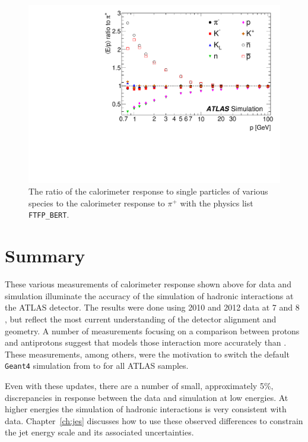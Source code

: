 \begin{figure}[htbp]
\centering
\includegraphics[width=.58\textwidth]{figures/simulated_response.pdf}
\caption{The ratio of the calorimeter response to single particles of various species to the calorimeter response to $\pi^+$ with the physics list \texttt{FTFP\_BERT}.}
\label{fig:simulated_response}
\end{figure}


\section{Summary}

These various measurements of calorimeter response shown above for data and simulation illuminate the accuracy of the simulation of hadronic interactions at the ATLAS detector. 
The results were done using 2010 and 2012 data at 7 and 8 \TeV, but reflect the most current understanding of the detector alignment and geometry.
A number of measurements focusing on a comparison between protons and antiprotons suggest that \FTFP models those interaction more accurately than \QGSP.
These measurements, among others, were the motivation to switch the default \texttt{Geant4} simulation from \FTFP to \QGSP for all ATLAS samples. 

Even with these updates, there are a number of small, approximately 5\%, discrepancies in response between the data and simulation at low energies.
At higher energies the simulation of hadronic interactions is very consistent with data. 
Chapter~\ref{ch:jes} discusses how to use these observed differences to constrain the jet energy scale and its associated uncertainties.
